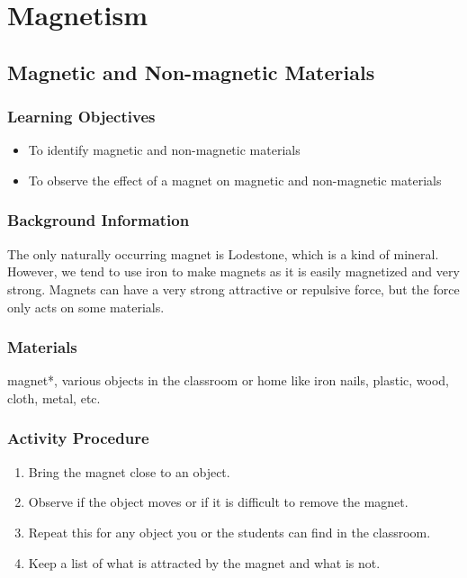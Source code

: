 \section{Magnetism}

\subsection{Magnetic and Non-magnetic Materials}

\subsubsection*{Learning Objectives}
\begin{itemize}
\item{To identify magnetic and non-magnetic materials} 
\item{To observe the effect of a magnet on magnetic and non-magnetic materials} 
\end{itemize}

\subsubsection*{Background Information}
The only naturally occurring magnet is Lodestone, which is a kind of mineral. However, we tend to use iron to make magnets as it is easily magnetized and very strong. Magnets can have a very strong attractive or repulsive force, but the force only acts on some materials.

\subsubsection*{Materials}
magnet*, various objects in the classroom or home like iron nails, plastic, wood, cloth, metal, etc.  


\subsubsection*{Activity Procedure}
\begin{enumerate}
\item{Bring the magnet close to an object.} 
\item{Observe if the object moves or if it is difficult to remove the magnet.} 
\item{Repeat this for any object you or the students can find in the classroom.} 
\item{Keep a list of what is attracted by the magnet and what is not.} 
\end{enumerate}

